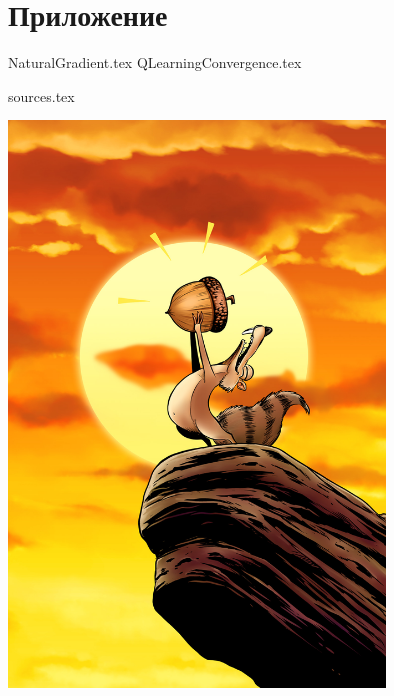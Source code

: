 \documentclass[a4paper, 10pt, oneside]{memoir}
\begin{document}
\appendix

\chapter{Приложение}

{NaturalGradient.tex}
{QLearningConvergence.tex}

{sources.tex}

\newpage
\thispagestyle{empty}
\begin{center}
\vspace*{5cm}
\includegraphics[width=10cm]{Images/reach.jpg}
\end{center}
\end{document}
